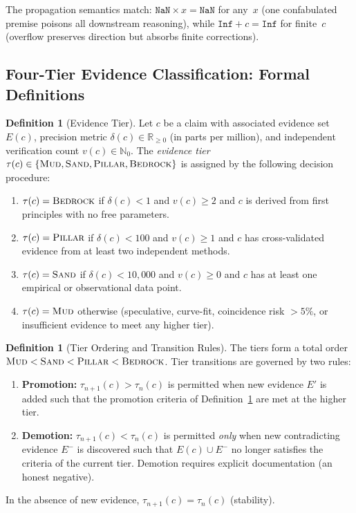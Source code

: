 \documentclass[11pt]{article}
\theoremstyle{definition}
\newtheorem{definition}[theorem]{Definition}
\theoremstyle{remark}
\newcommand{\NaN}{\texttt{NaN}}
\newcommand{\Inf}{\texttt{Inf}}
\newcommand{\BEDROCK}{\textsc{Bedrock}}
\newcommand{\PILLAR}{\textsc{Pillar}}
\newcommand{\SAND}{\textsc{Sand}}
\newcommand{\MUD}{\textsc{Mud}}
\begin{document}
\noindent The propagation semantics match: $\NaN \times x = \NaN$ for any~$x$
(one confabulated premise poisons all downstream reasoning), while
$\Inf + c = \Inf$ for finite~$c$ (overflow preserves direction but absorbs
finite corrections).

\subsection{Four-Tier Evidence Classification: Formal Definitions}
\label{sec:four-tier-formal}

\begin{definition}[Evidence Tier]
\label{def:evidence-tier}
Let $c$ be a claim with associated evidence set $E(c)$, precision metric
$\delta(c) \in \mathbb{R}_{\geq 0}$ (in parts per million), and independent
verification count $v(c) \in \mathbb{N}_0$.  The \emph{evidence tier}
$\tau(c) \in \{\MUD, \SAND, \PILLAR, \BEDROCK\}$ is assigned by the following
decision procedure:
\begin{enumerate}
  \item $\tau(c) = \BEDROCK$ if $\delta(c) < 1$ and $v(c) \geq 2$ and $c$
    is derived from first principles with no free parameters.
  \item $\tau(c) = \PILLAR$ if $\delta(c) < 100$ and $v(c) \geq 1$ and $c$
    has cross-validated evidence from at least two independent methods.
  \item $\tau(c) = \SAND$ if $\delta(c) < 10{,}000$ and $v(c) \geq 0$ and $c$
    has at least one empirical or observational data point.
  \item $\tau(c) = \MUD$ otherwise (speculative, curve-fit, coincidence risk
    $> 5\%$, or insufficient evidence to meet any higher tier).
\end{enumerate}
\end{definition}

\begin{definition}[Tier Ordering and Transition Rules]
\label{def:tier-ordering}
The tiers form a total order $\MUD < \SAND < \PILLAR < \BEDROCK$.
Tier transitions are governed by two rules:
\begin{enumerate}
  \item \textbf{Promotion:} $\tau_{n+1}(c) > \tau_n(c)$ is permitted when new
    evidence $E'$ is added such that the promotion criteria of
    Definition~\ref{def:evidence-tier} are met at the higher tier.
  \item \textbf{Demotion:} $\tau_{n+1}(c) < \tau_n(c)$ is permitted
    \emph{only} when new contradicting evidence $E^-$ is discovered such that
    $E(c) \cup E^-$ no longer satisfies the criteria of the current tier.
    Demotion requires explicit documentation (an honest negative).
\end{enumerate}
In the absence of new evidence, $\tau_{n+1}(c) = \tau_n(c)$ (stability).
\end{definition}
\end{document}
